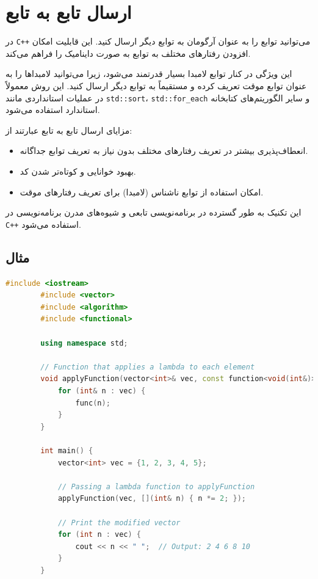 \documentclass[12pt, a4paper]{report}
\begin{document}
\section{ارسال تابع به تابع }

در \texttt{C++} می‌توانید توابع را به عنوان آرگومان به توابع دیگر ارسال کنید. این قابلیت امکان افزودن رفتارهای مختلف به توابع به صورت داینامیک را فراهم می‌کند. 

این ویژگی در کنار توابع لامبدا بسیار قدرتمند می‌شود، زیرا می‌توانید لامبداها را به عنوان توابع موقت تعریف کرده و مستقیماً به توابع دیگر ارسال کنید. این روش معمولاً در عملیات استانداردی مانند \texttt{std::sort}، \texttt{std::for\_each} و سایر الگوریتم‌های کتابخانه استاندارد استفاده می‌شود.

مزایای ارسال تابع به تابع عبارتند از:
\begin{itemize}
	\item انعطاف‌پذیری بیشتر در تعریف رفتارهای مختلف بدون نیاز به تعریف توابع جداگانه.
	\item بهبود خوانایی و کوتاه‌تر شدن کد.
	\item امکان استفاده از توابع ناشناس (لامبدا) برای تعریف رفتارهای موقت.
\end{itemize}

این تکنیک به طور گسترده در برنامه‌نویسی تابعی و شیوه‌های مدرن برنامه‌نویسی در \texttt{C++} استفاده می‌شود.


\subsection{مثال}


\begin{LTR} %
	\begin{lstlisting}[language=C++, breaklines=true]
		#include <iostream>
		#include <vector>
		#include <algorithm>
		#include <functional>
		
		using namespace std;
		
		// Function that applies a lambda to each element
		void applyFunction(vector<int>& vec, const function<void(int&)>& func) {
			for (int& n : vec) {
				func(n);
			}
		}
		
		int main() {
			vector<int> vec = {1, 2, 3, 4, 5};
			
			// Passing a lambda function to applyFunction
			applyFunction(vec, [](int& n) { n *= 2; });
			
			// Print the modified vector
			for (int n : vec) {
				cout << n << " ";  // Output: 2 4 6 8 10
			}
		}
	\end{lstlisting}
\end{LTR}
\end{document}
